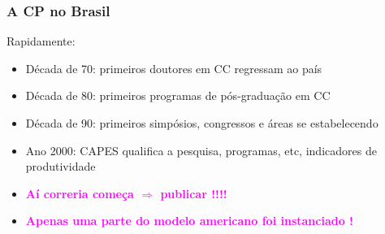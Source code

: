 \documentclass{beamer}
\begin{document}
\begin{frame}[fragile]
\frametitle{A CP no Brasil}
Rapidamente:
\begin{itemize}
    \item Década de 70: primeiros doutores em CC regressam ao país
    \item Década de 80: primeiros programas de pós-graduação em CC 
    \item Década de 90: primeiros simpósios, congressos e áreas se estabelecendo
    \item Ano 2000: CAPES qualifica a pesquisa, programas, etc, indicadores de produtividade
    
    \pause
    \item {\bf \textcolor{magenta}{Aí correria começa  $\Rightarrow$ publicar !!!!}}
    \item {\bf \textcolor{magenta}{Apenas uma parte do modelo americano foi instanciado !}}
\end{itemize}

\end{frame}
\end{document}
